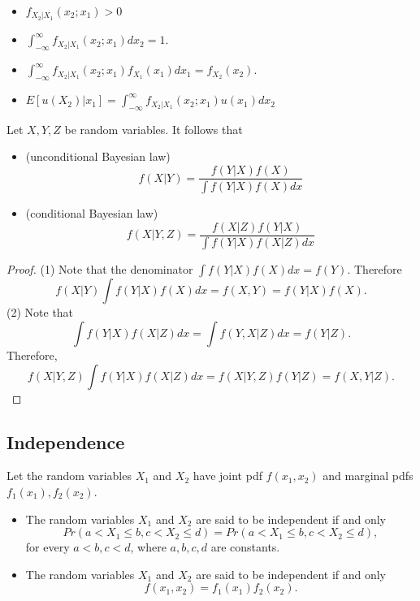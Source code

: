 \begin{refsection}
\begin{lemma}\cite[97]{hoggintroduction}
	
\begin{itemize}
	\item $f_{X_2|X_1}(x_2;x_1) > 0$
	\item $\int_{-\infty}^{\infty} f_{X_2|X_1}(x_2;x_1) dx_2 = 1.$
	\item $\int_{-\infty}^{\infty} f_{X_2|X_1}(x_2;x_1) f_{X_1}(x_1)dx_1 = f_{X_2}(x_2).$
	\item $E[u(X_2)|x_1] = \int_{-\infty}^{\infty} f_{X_2|X_1}(x_2;x_1) u(x_1)dx_2 $
	
\end{itemize}	
\end{lemma}


\begin{theorem}\label{ch:theory-of-probability:th:BayesianLawForRandomVariables}
Let $X,Y,Z$ be random variables. It follows that	
\begin{itemize}
	\item (unconditional Bayesian law)
	$$f(X|Y) = \frac{f(Y|X)f(X)}{\int f(Y|X)f(X)dx}$$
	\item (conditional Bayesian law)
	$$f(X|Y,Z) = \frac{f(X|Z)f(Y|X)}{\int f(Y|X)f(X|Z)dx}$$
\end{itemize}	
\end{theorem}
\begin{proof}
(1) Note that the denominator 	$\int f(Y|X)f(X)dx = f(Y)$. Therefore
$$f(X|Y)\int f(Y|X)f(X)dx = f(X,Y) = f(Y|X)f(X).$$
(2) Note that
	$$\int f(Y|X)f(X|Z)dx = \int f(Y,X|Z) dx = f(Y|Z).$$
Therefore, 
	$$f(X|Y,Z)\int f(Y|X)f(X|Z)dx = f(X|Y,Z)f(Y|Z) = f(X,Y|Z).$$
\end{proof}


\subsection{Independence}



\begin{definition}\cite[112,115]{hoggintroduction}
Let the random variables $X_1$ and $X_2$ have joint pdf $f(x_1,x_2)$ and marginal pdfs $f_1(x_1),f_2(x_2)$. 	
\begin{itemize}
	\item The random variables $X_1$ and $X_2$ are said to be independent if and only 
	$$Pr(a<X_1\leq b,c<X_2\leq d) = Pr(a<X_1\leq b,c<X_2\leq d),$$
	for every $a<b,c<d$, where $a,b,c,d$ are constants.
	\item The random variables $X_1$ and $X_2$ are said to be independent if and only 
	$$f(x_1,x_2) = f_1(x_1)f_2(x_2).$$
\end{itemize}
\end{definition}





\end{refsection}
